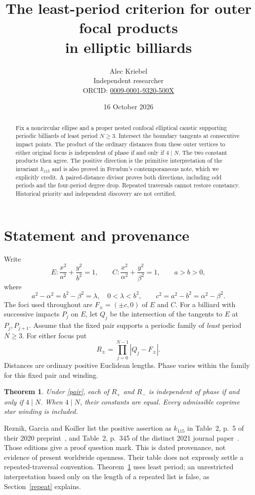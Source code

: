 \documentclass[11pt]{article}
\title{The least-period criterion for outer focal products\\in elliptic billiards}
\author{Alec Kriebel\\\small Independent researcher\\
\small ORCID: \href{https://orcid.org/0009-0001-9320-500X}{0009-0001-9320-500X}}
\date{16 October 2026}
\newtheorem{theorem}{Theorem}
\begin{document}
\maketitle
\begin{abstract}
Fix a noncircular ellipse and a proper nested confocal elliptical caustic
supporting periodic billiards of least period $N\geq3$. Intersect the boundary
tangents at consecutive impact points. The product of the ordinary distances
from these outer vertices to either original focus is independent of phase
if and only if $4\mid N$. The two constant products then agree. The positive
direction is the primitive interpretation of the invariant $k_{115}$ and is
also proved in Ferudun's contemporaneous note, which we explicitly credit.
A paired-distance divisor proves both directions, including odd periods and
the four-period degree drop. Repeated traversals cannot restore constancy.
Historical priority and independent discovery are not certified.
\end{abstract}

\section{Statement and provenance}
Write
\[
 E:\frac{x^2}{a^2}+\frac{y^2}{b^2}=1,\qquad
 C:\frac{x^2}{\alpha^2}+\frac{y^2}{\beta^2}=1,
 \qquad a>b>0,
\]
where
\begin{equation}\label{pair}
 a^2-\alpha^2=b^2-\beta^2=\lambda,\quad 0<\lambda<b^2,
 \qquad c^2=a^2-b^2=\alpha^2-\beta^2.
\end{equation}
The foci used throughout are $F_\pm=(\pm c,0)$ of $E$ and $C$.
For a billiard with successive impacts $P_j$ on $E$, let $Q_j$ be the
intersection of the tangents to $E$ at $P_j,P_{j+1}$. Assume that the
fixed pair supports a periodic family of \emph{least} period $N\geq3$.
For either focus put
\[
 R_\pm=\prod_{j=0}^{N-1}|Q_j-F_\pm|.
\]
Distances are ordinary positive Euclidean lengths. Phase varies within the
family for this fixed pair and winding.

\begin{theorem}\label{main}
Under \eqref{pair}, each of $R_+$ and $R_-$ is independent of phase if
and only if $4\mid N$. When $4\mid N$, their constants are equal.
Every admissible coprime star winding is included.
\end{theorem}

Reznik, Garcia and Koiller list the positive assertion as $k_{115}$ in
Table~2, p.~5 of their 2020 preprint~\cite{RGKpre}, and Table~2,
p.~345 of the distinct 2021 journal paper~\cite{RGK}. Those editions
give a proof question mark. This is dated provenance, not evidence of
present worldwide openness. Their table does not expressly settle a
repeated-traversal convention. Theorem~\ref{main} uses least period;
an unrestricted interpretation based only on the length of a repeated
list is false, as Section~\ref{repeat} explains.
\end{document}
